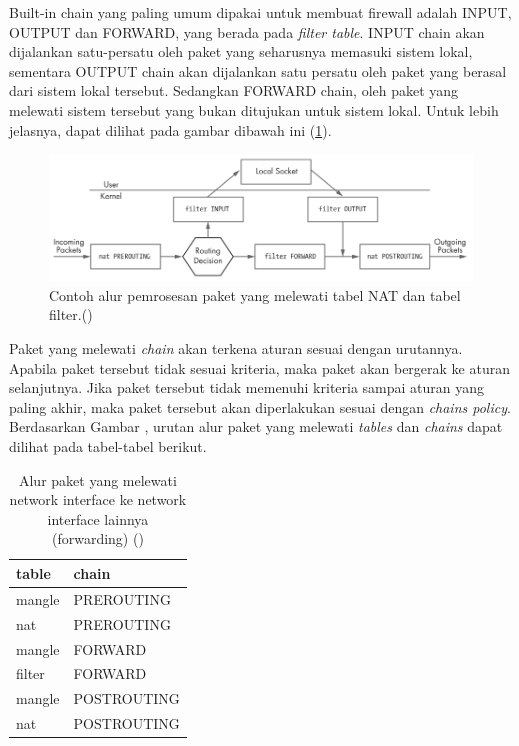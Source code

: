 Built-in chain yang paling umum dipakai untuk membuat firewall adalah INPUT, OUTPUT dan FORWARD, yang berada pada \textit{filter table}. INPUT chain akan dijalankan satu-persatu oleh paket yang seharusnya memasuki sistem lokal, sementara OUTPUT chain akan dijalankan satu persatu oleh paket yang berasal dari sistem lokal tersebut. Sedangkan FORWARD chain, oleh paket yang melewati sistem tersebut yang bukan ditujukan untuk sistem lokal. Untuk lebih jelasnya, dapat dilihat pada gambar dibawah ini (\ref{fig:iptables_packet_flow}). 
\begin{figure}[H]
	\centering
	\includegraphics[width=\textwidth]{resources/iptables_packet_flow.png}
	\caption{Contoh alur pemrosesan paket yang melewati tabel NAT dan tabel filter.(\cite{rash2007linux})}
	\label{fig:iptables_packet_flow}
\end{figure}

Paket yang melewati \textit{chain} akan terkena aturan sesuai dengan urutannya. Apabila paket tersebut tidak sesuai kriteria, maka paket akan bergerak ke aturan selanjutnya. Jika paket tersebut tidak memenuhi kriteria sampai aturan yang paling akhir, maka paket tersebut akan diperlakukan sesuai dengan \textit{chain\textquotesingle s policy}. 
Berdasarkan Gambar , urutan alur paket yang melewati \textit{tables} dan \textit{chains} dapat dilihat pada tabel-tabel berikut.

\begin{table}[H]
	\caption{Alur paket yang melewati network interface ke network interface lainnya (forwarding) (\cite{purdy2004linux})}
	\label{table:network_to_network}
	\centering
	\begin{tabular}{ll}
		\hline
		\rowcolor[HTML]{C0C0C0} 
		table  & chain       \\ \hline
		mangle & PREROUTING  \\
		nat    & PREROUTING  \\
		mangle & FORWARD     \\
		filter & FORWARD     \\
		mangle & POSTROUTING \\
		nat    & POSTROUTING \\ \hline
	\end{tabular}
\end{table}

